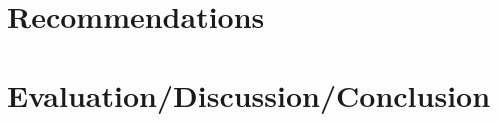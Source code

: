 \documentclass[12pt,a4paper,oneside,pdftex]{report}
\begin{document}



% 

\chapter{Recommendations}
\label{chapter:Recommendations}



% 

\chapter{Evaluation/Discussion/Conclusion}
\label{chapter:evaluation}
\end{document}
